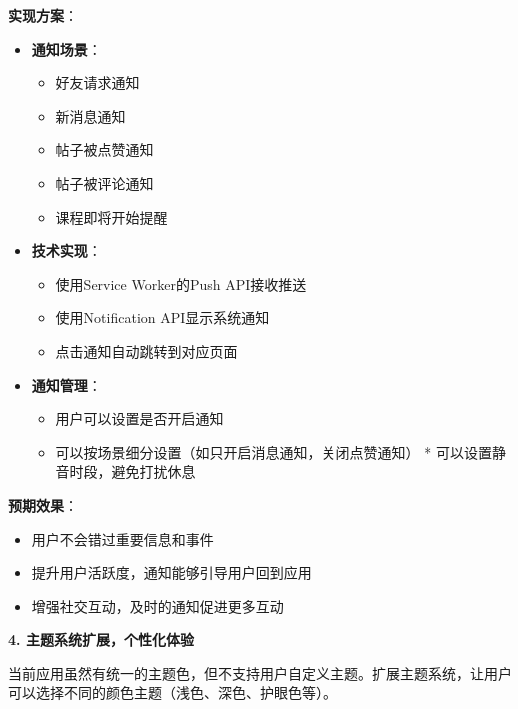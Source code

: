 \documentclass[12pt,a4paper]{article}
\begin{document}
\textbf{实现方案}：
\begin{itemize}
    \item \textbf{通知场景}：
        \begin{itemize}
            \item 好友请求通知
            \item 新消息通知
            \item 帖子被点赞通知
            \item 帖子被评论通知
            \item 课程即将开始提醒
        \end{itemize}
    \item \textbf{技术实现}：
        \begin{itemize}
            \item 使用Service Worker的Push API接收推送
            \item 使用Notification API显示系统通知
            \item 点击通知自动跳转到对应页面
        \end{itemize}
    \item \textbf{通知管理}：
        \begin{itemize}
            \item 用户可以设置是否开启通知
            \item 可以按场景细分设置（如只开启消息通知，关闭点赞通知）
            * 可以设置静音时段，避免打扰休息
        \end{itemize}
\end{itemize}

\textbf{预期效果}：
\begin{itemize}
    \item 用户不会错过重要信息和事件
    \item 提升用户活跃度，通知能够引导用户回到应用
    \item 增强社交互动，及时的通知促进更多互动
\end{itemize}

\textbf{4. 主题系统扩展，个性化体验}

当前应用虽然有统一的主题色，但不支持用户自定义主题。扩展主题系统，让用户可以选择不同的颜色主题（浅色、深色、护眼色等）。
\end{document}
